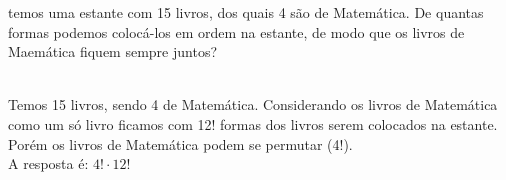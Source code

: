 \begin{ex}
 temos uma estante com 15 livros, dos quais 4 são de Matemática. De quantas formas podemos colocá-los em ordem na estante, de modo que os livros de Maemática fiquem sempre juntos?
  \begin{sol}
      \phantom{A} \\
  Temos 15 livros, sendo 4 de Matemática. Considerando os livros de Matemática como um só livro ficamos com 12! formas dos livros serem colocados na estante. Porém os livros de Matemática podem se permutar (4!).\\
  A resposta é: $4!\cdot12!$
  \end{sol}
\end{ex}